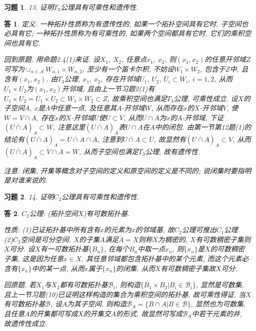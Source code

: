 \documentclass{ctexart}%
\newtheorem*{exercise}{习题}
\newtheorem*{solution}{答}
\theoremstyle{definition}
\theoremstyle{remark}
\begin{document}
\begin{exercise}13. 证明$T_3$公理具有可乘性和遗传性.
\end{exercise}
\begin{solution}
定义: 一种拓扑性质称为有遗传性的, 如果一个拓扑空间具有它时, 子空间也必具有它; 一种拓扑性质称为有可乘性的, 如果两个空间都具有它时, 它们的乘积空间也具有它. 

回到原题. 用命题2.4(1)来证. 设$X_1$, $X_2$, 任意点$x_1$, $x_2$, 则$(x_1,x_2)$的任意开邻域$Z$可写为$\cup_{\alpha\in \mathscr{A}}W_{\alpha,1}\times  W_{\alpha,2}$, 至少有一个笛卡尔积, 不妨设$W_1\times W_2$, 包含于$Z$中, 且含有$(x_1,x_2)$. 由$T_3$公理, $x_1$, $x_2$, 存在开邻域$U_1$, $U_2$, $\overline{U}_i\subset W_i$, $i=1,2$, 从而$U_1\times U_2$为$(x_1,x_2)$开邻域, 且由上一节习题2(1)有$\overline{U_1\times U_2}=\overline{U}_1\times\overline{U}_2\subset W_1\times W_2\subset Z$, 故乘积空间也满足$T_3$公理, 可乘性成立. 设$X$的子空间$A$, $x$是$A$中任意一点, 及任意其$A$-开邻域$W$, 从而存在$x$的$X$-开邻域$V$, 使$W=V\cap A$, 存在$x$的$X$-开邻域$U$使$\overline{U}\subset V$, 从而$U\cap A$为$x$的$A$-开邻域, 下证$(\overline{U\cap A})_A\subset W$, 注意这里$(\overline{U\cap A})_A$表$U\cap A$在$A$中的闭包. 由第一节第12题(1)的结论有$(\overline{U\cap A})_A=\overline{U\cap A}\cap A$, 注意到$\overline{U\cap A}\subset \overline{U}$, 故显然有$(\overline{U\cap A})_A\subset V$, 从而$(\overline{U\cap A})_A\subset V\cap A=W$, 从而子空间也满足$T_3$公理, 故有遗传性.

注意: 闭集, 开集等概念对子空间的定义和原空间的定义是不同的; 说闭集时要指明是对谁来说的. 
\end{solution}

\begin{exercise}14. 证明$C_2$公理具有可乘性和遗传性.
\end{exercise}
\begin{solution}
$C_2$公理: (拓扑空间$X$)有可数拓扑基. 

 性质: (1)已证拓扑基中所有含有$x$的元素为$x$的邻域基, 故$C_2$公理可推出$C_1$公理. (2)$C_2$空间是可分空间. $X$的子集$A$满足$\overline{A}=X$则称$X$为稠密的, $X$有可数稠密子集则$X$可分. 设$X$有一可数拓扑基$\{B_n\}$, 在每个$B_n$中取一点$x_n$, 则$\{x_n\}$是$X$的可数稠密子集, 这是因为任意$x\in X$, 其任意邻域都包含拓扑基中的某个元素, 而这个元素必含有$\{x_n\}$中的某一点, 从而$x$属于$\{x_n\}$的闭集, 从而$X$有可数稠密子集故$X$可分.

回原题. 若$X_1$与$X_2$都有可数拓扑基$\mathscr{B}_i$, 则构造$\{B_1\times B_2|B_i\in \mathscr{B}_i\}$, 显然是可数集, 且上一节习题(10)已证明这样构造的集合为乘积空间的拓扑基. 故可乘性得证. 当$X$有可数拓扑基$\mathscr{B}$, 设$A$为其子空间, 则构造$\mathscr{B}_A=\{B\cap A|B\in \mathscr{B}\}$, 显然也为可数集, 且任意$A$的开集都可写成$X$的开集交$A$的形式, 故显然可写成$\mathscr{B}_A$中若干元素的并, 故遗传性成立. 
\end{solution}
\end{document}
